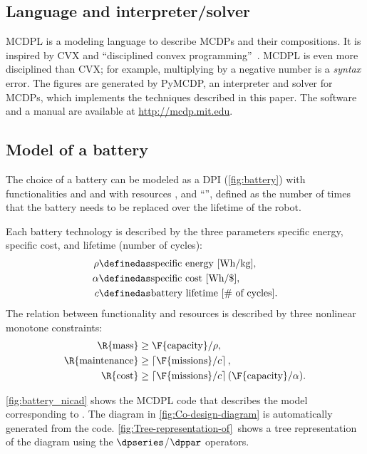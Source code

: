 \subsection{Language and interpreter/solver}

MCDPL is a modeling language to describe MCDPs and their compositions.
It is inspired by CVX and ``disciplined convex programming''~\cite{grant08graph}.
MCDPL is even more disciplined than CVX; for example, multiplying
by a negative number is a \emph{syntax} error. The figures are generated
by PyMCDP, an interpreter and solver for MCDPs, which implements the
techniques described in this paper. The software and a manual are
available at \url{http://mcdp.mit.edu}.

\subsection{Model of a battery}

The choice of a battery can be modeled as a DPI (\cref{fig:battery})
with functionalities  and 
and with resources ,  and ``'',
defined as the number of times that the battery needs to be replaced
over the lifetime of the robot.

Each battery technology is described by the three parameters specific
energy, specific cost, and lifetime (number of cycles):
\begin{align*}
  \rho & \definedas\text{specific energy [Wh/kg]},\\
  \alpha & \definedas\text{specific cost [Wh/\$]},\\
  c & \definedas\text{battery lifetime [\# of cycles]}.
\end{align*}
The relation between functionality and resources is described by three
nonlinear monotone constraints:
\begin{align}
  \R{\text{mass}} & \geq\F{\text{capacity}}/\rho,\label{eq:mass}\\
  \R{\text{maintenance}} & \geq\left\lceil \F{\text{missions}}/c\right\rceil ,\label{eq:maintenance}\\
  \R{\text{cost}} & \geq\left\lceil \F{\text{missions}}/c\right\rceil (\F{\text{capacity}}/\alpha).\label{eq:cost}
\end{align}

\cref{fig:battery_nicad} shows the MCDPL code that describes the
model corresponding to .
The diagram in \cref{fig:Co-design-diagram} is automatically generated
from the code. \cref{fig:Tree-representation-of}~shows a tree representation
of the diagram using the $\dpseries$/$\dppar$ operators.

